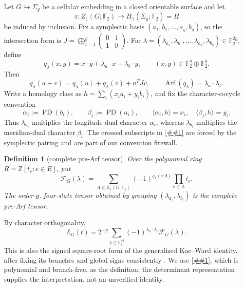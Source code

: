 \documentclass[11pt]{article}
\newcommand{\cref}[1]{\autoref{##1}}%
\newtheorem{definition}[theorem]{Definition}
\newcommand{\Ftwo}{\mathbb F_2}
\newcommand{\cE}{\mathcal E}
\newcommand{\cF}{\mathcal F}
\newcommand{\Arf}{\operatorname{Arf}}
\begin{document}
Let \(G\hookrightarrow\Sigma_g\) be a cellular embedding in a closed
orientable surface and let
\[
 \pi:Z_1(G;\Ftwo)\longrightarrow H_1(\Sigma_g;\Ftwo)=H
\]
be induced by inclusion.  Fix a symplectic basis
\((a_1,b_1,\ldots,a_g,b_g)\), so the intersection form is
\(J=\bigoplus_{i=1}^g\left(\begin{smallmatrix}0&1\\1&0\end{smallmatrix}\right)\).
For
\(\lambda=(\lambda_{a_1},\lambda_{b_1},\ldots,
\lambda_{a_g},\lambda_{b_g})\in\Ftwo^{2g}\), define
\begin{equation}\label{eq:q}
 q_\lambda(x,y)=x\cdot y+\lambda_a\cdot x+\lambda_b\cdot y,
 \qquad (x,y)\in\Ftwo^g\oplus\Ftwo^g.
\end{equation}
Then
\[
 q_\lambda(u+v)=q_\lambda(u)+q_\lambda(v)+u^TJv,
 \qquad
 \Arf(q_\lambda)=\lambda_a\cdot\lambda_b.
\]
Write a homology class as
\(h=\sum_i(x_i a_i+y_i b_i)\), and fix the character-cocycle convention
\begin{equation}\label{eq:dual-character-table}
 \alpha_i:=\operatorname{PD}(b_i),\qquad
 \beta_i:=\operatorname{PD}(a_i),
 \qquad
 \langle\alpha_i,h\rangle=x_i,\quad
 \langle\beta_i,h\rangle=y_i.
\end{equation}
Thus \(\lambda_{a_i}\) multiplies the longitude-dual character
\(\alpha_i\), whereas \(\lambda_{b_i}\) multiplies the meridian-dual
character \(\beta_i\).  The crossed subscripts in
\cref{eq:dual-character-table} are forced by the symplectic pairing and are
part of our convention firewall.

\begin{definition}[complete pre-Arf tensor]\label{def:F}
Over the polynomial ring \(R=\mathbb Z[t_e:e\in E]\), put
\begin{equation}\label{eq:F}
 \cF_G(\lambda)
  =\sum_{A\in Z_1(G;\Ftwo)}
       (-1)^{q_\lambda(\pi A)}\prod_{e\in A}t_e.
\end{equation}
The order-\(g\), four-state tensor obtained by grouping
\((\lambda_{a_i},\lambda_{b_i})\) is the complete pre-Arf tensor.
\end{definition}

By character orthogonality,
\begin{equation}\label{eq:arf}
 \cE_G(t)=2^{-g}\sum_{\lambda\in\Ftwo^{2g}}
     (-1)^{\lambda_a\cdot\lambda_b}\cF_G(\lambda).
\end{equation}
This is also the signed square-root form of the generalized Kac--Ward
identity, after fixing its branches and global signs consistently
\cite[Theorem~2.1]{Cimasoni2010}.  We use \cref{eq:F}, which is polynomial
and branch-free, as the definition; the determinant representation supplies
the interpretation, not an unverified identity.
\end{document}
